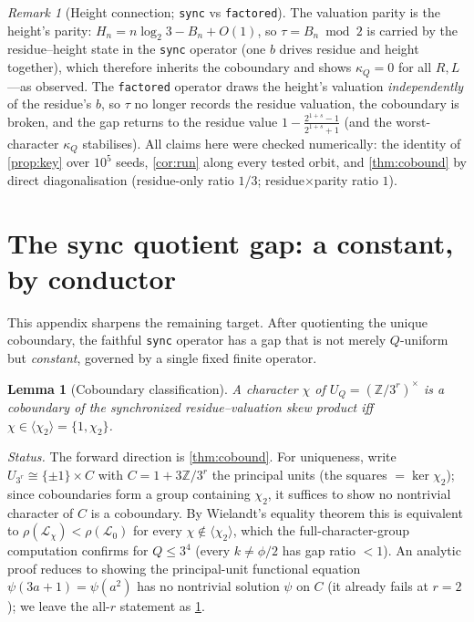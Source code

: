 \documentclass[11pt]{article}
\newcommand{\Z}{\mathbb{Z}}
\newcommand{\Lcal}{\mathcal{L}}
\theoremstyle{plain}
\newtheorem{lemma}{Lemma}
\theoremstyle{remark}
\newtheorem*{remark}{Remark}
\begin{document}
\begin{remark}[Height connection; \texttt{sync} vs \texttt{factored}]
The valuation parity is the height's parity: $H_n=n\log_2 3-B_n+O(1)$, so
$\tau=B_n\bmod2$ is carried by the residue--height state in the \texttt{sync}
operator (one $b$ drives residue and height together), which therefore inherits
the coboundary and shows $\kappa_Q=0$ for all $R,L$---as observed. The
\texttt{factored} operator draws the height's valuation \emph{independently} of the
residue's $b$, so $\tau$ no longer records the residue valuation, the coboundary
is broken, and the gap returns to the residue value
$1-\tfrac{2^{1+s}-1}{2^{1+s}+1}$ (and the worst-character $\kappa_Q$ stabilises).
All claims here were checked numerically: the identity of \cref{prop:key} over
$10^5$ seeds, \cref{cor:run} along every tested orbit, and
\cref{thm:cobound} by direct diagonalisation (residue-only ratio $1/3$;
residue$\times$parity ratio $1$).
\end{remark}

\section{The sync quotient gap: a constant, by conductor}
\label{app:gap}

This appendix sharpens the remaining target. After quotienting the unique
coboundary, the faithful \texttt{sync} operator has a gap that is not merely
$Q$-uniform but \emph{constant}, governed by a single fixed finite operator.

\begin{lemma}[Coboundary classification]\label{lem:cobclass}
A character $\chi$ of $U_Q=(\Z/3^r)^\times$ is a coboundary of the synchronized
residue--valuation skew product iff $\chi\in\langle\chi_2\rangle=\{1,\chi_2\}$.
\end{lemma}
\noindent\emph{Status.} The forward direction is \cref{thm:cobound}. For
uniqueness, write $U_{3^r}\cong\{\pm1\}\times C$ with $C=1+3\Z/3^r$ the principal
units (the squares $=\ker\chi_2$); since coboundaries form a group containing
$\chi_2$, it suffices to show no nontrivial character of $C$ is a coboundary. By
Wielandt's equality theorem this is equivalent to $\rho(\Lcal_{\chi})<\rho(\Lcal_0)$
for every $\chi\notin\langle\chi_2\rangle$, which the full-character-group
computation confirms for $Q\le3^4$ (every $k\ne\phi/2$ has gap ratio $<1$). An
analytic proof reduces to showing the principal-unit functional equation
$\psi(3a+1)=\psi(a^2)$ has no nontrivial solution $\psi$ on $C$ (it already fails
at $r=2$); we leave the all-$r$ statement as \cref{lem:cobclass}.
\end{document}
